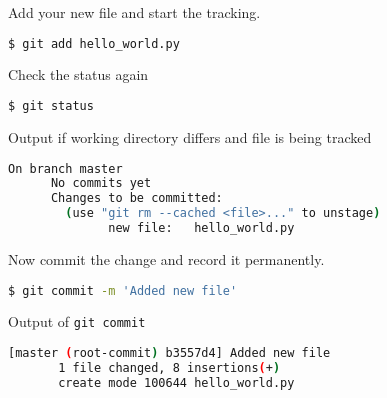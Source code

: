 \begin{frame}[fragile]
\emptyframetitle
  Add your new file and start the tracking.
  \begin{lstlisting}[language=bash]
  $ git add hello_world.py
  \end{lstlisting}
  Check the status again  
  \begin{lstlisting}[language=bash]
  $ git status
  \end{lstlisting}
 
  \begin{block}{Output if working directory differs and file is being tracked}
    \begin{lstlisting}[language=bash]
      On branch master
      No commits yet
      Changes to be committed:
        (use "git rm --cached <file>..." to unstage)
              new file:   hello_world.py
    \end{lstlisting}
  \end{block}
\end{frame}

\begin{frame}[fragile]
\emptyframetitle

  Now commit the change and record it permanently.
  \begin{lstlisting}[language=bash]
  $ git commit -m 'Added new file'
  \end{lstlisting}

  \begin{block}{Output of \texttt{git commit}}
    \begin{lstlisting}[language=bash]
      [master (root-commit) b3557d4] Added new file
       1 file changed, 8 insertions(+)
       create mode 100644 hello_world.py
    \end{lstlisting}
  \end{block}
\end{frame}

